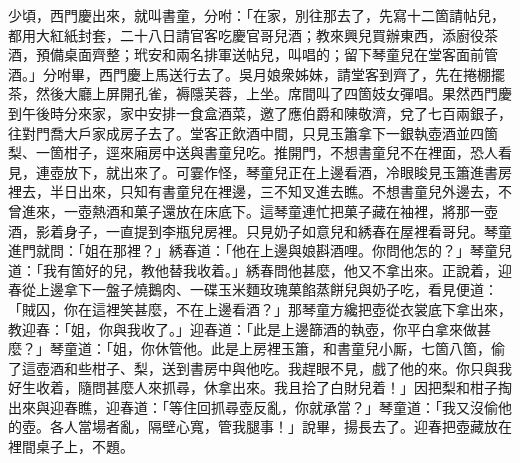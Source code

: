 少頃，西門慶出來，就叫書童，分咐：「在家，別往那去了，先寫十二箇請帖兒，都用大紅紙封套，二十八日請官客吃慶官哥兒酒；教來興兒買辦東西，添廚役茶酒，預備桌面齊整；玳安和兩名排軍送帖兒，叫唱的；留下琴童兒在堂客面前管酒。」分咐畢，西門慶上馬送行去了。吳月娘衆姊妹，請堂客到齊了，先在捲棚擺茶，然後大廳上屏開孔雀，褥隱芙蓉，上坐。席間叫了四箇妓女彈唱。果然西門慶到午後時分來家，家中安排一食盒酒菜，邀了應伯爵和陳敬濟，兌了七百兩銀子，往對門喬大戶家成房子去了。堂客正飲酒中間，只見玉簫拿下一銀執壺酒並四箇梨、一箇柑子，逕來廂房中送與書童兒吃。推開門，不想書童兒不在裡面，恐人看見，連壺放下，就出來了。可霎作怪，琴童兒正在上邊看酒，冷眼睃見玉簫進書房裡去，半日出來，只知有書童兒在裡邊，三不知叉進去瞧。不想書童兒外邊去，不曾進來，一壺熱酒和菓子還放在床底下。這琴童連忙把菓子藏在袖裡，將那一壺酒，影着身子，一直提到李瓶兒房裡。只見奶子如意兒和綉春在屋裡看哥兒。琴童進門就問：「姐在那裡？」綉春道：「他在上邊與娘斟酒哩。你問他怎的？」琴童兒道：「我有箇好的兒，教他替我收着。」綉春問他甚麼，他又不拿出來。正說着，迎春從上邊拿下一盤子燒鵝肉、一碟玉米麵玫瑰菓餡蒸餅兒與奶子吃，看見便道：「賊囚，你在這裡笑甚麼，不在上邊看酒？」那琴童方纔把壺從衣裳底下拿出來，教迎春：「姐，你與我收了。」迎春道：「此是上邊篩酒的執壺，你平白拿來做甚麼？」琴童道：「姐，你休管他。此是上房裡玉簫，和書童兒小厮，七箇八箇，偷了這壺酒和些柑子、梨，送到書房中與他吃。我趕眼不見，戲了他的來。你只與我好生收着，隨問甚麼人來抓尋，休拿出來。我且拾了白財兒着！」因把梨和柑子掏出來與迎春瞧，迎春道：「等住回抓尋壺反亂，你就承當？」琴童道：「我又沒偷他的壺。各人當場者亂，隔壁心寬，管我腿事！」說畢，揚長去了。迎春把壺藏放在裡間桌子上，不題。

